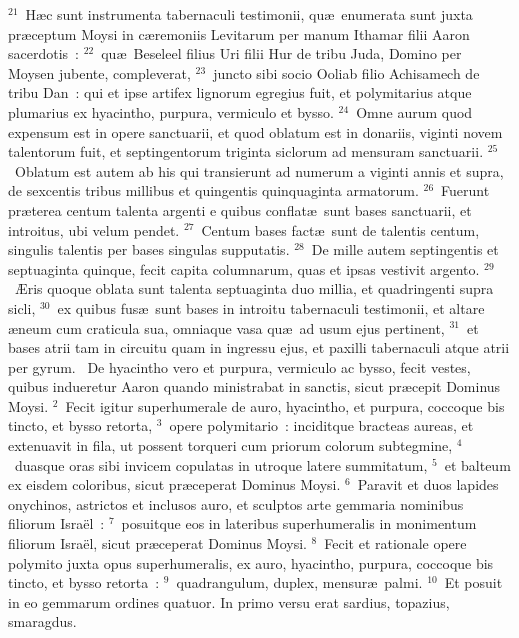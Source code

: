 ${}^{21}$~H\ae c sunt instrumenta tabernaculi testimonii, qu\ae\ enumerata sunt juxta pr\ae ceptum Moysi in c\ae remoniis Levitarum per manum Ithamar filii Aaron sacerdotis~:
${}^{22}$~qu\ae\ Beseleel filius Uri filii Hur de tribu Juda, Domino per Moysen jubente, compleverat,
${}^{23}$~juncto sibi socio Ooliab filio Achisamech de tribu Dan~: qui et ipse artifex lignorum egregius fuit, et polymitarius atque plumarius ex hyacintho, purpura, vermiculo et bysso.
${}^{24}$~Omne aurum quod expensum est in opere sanctuarii, et quod oblatum est in donariis, viginti novem talentorum fuit, et septingentorum triginta siclorum ad mensuram sanctuarii.
${}^{25}$~Oblatum est autem ab his qui transierunt ad numerum a viginti annis et supra, de sexcentis tribus millibus et quingentis quinquaginta armatorum.
${}^{26}$~Fuerunt pr\ae terea centum talenta argenti e quibus conflat\ae\ sunt bases sanctuarii, et introitus, ubi velum pendet.
${}^{27}$~Centum bases fact\ae\ sunt de talentis centum, singulis talentis per bases singulas supputatis.
${}^{28}$~De mille autem septingentis et septuaginta quinque, fecit capita columnarum, quas et ipsas vestivit argento.
${}^{29}$~\AE ris quoque oblata sunt talenta septuaginta duo millia, et quadringenti supra sicli,
${}^{30}$~ex quibus fus\ae\ sunt bases in introitu tabernaculi testimonii, et altare \ae neum cum craticula sua, omniaque vasa qu\ae\ ad usum ejus pertinent,
${}^{31}$~et bases atrii tam in circuitu quam in ingressu ejus, et paxilli tabernaculi atque atrii per gyrum.
~De hyacintho vero et purpura, vermiculo ac bysso, fecit vestes, quibus indueretur Aaron quando ministrabat in sanctis, sicut pr\ae cepit Dominus Moysi.
${}^{2}$~Fecit igitur superhumerale de auro, hyacintho, et purpura, coccoque bis tincto, et bysso retorta,
${}^{3}$~opere polymitario~: inciditque bracteas aureas, et extenuavit in fila, ut possent torqueri cum priorum colorum subtegmine,
${}^{4}$~duasque oras sibi invicem copulatas in utroque latere summitatum,
${}^{5}$~et balteum ex eisdem coloribus, sicut pr\ae ceperat Dominus Moysi.
${}^{6}$~Paravit et duos lapides onychinos, astrictos et inclusos auro, et sculptos arte gemmaria nominibus filiorum Isra\"el~:
${}^{7}$~posuitque eos in lateribus superhumeralis in monimentum filiorum Isra\"el, sicut pr\ae ceperat Dominus Moysi.
${}^{8}$~Fecit et rationale opere polymito juxta opus superhumeralis, ex auro, hyacintho, purpura, coccoque bis tincto, et bysso retorta~:
${}^{9}$~quadrangulum, duplex, mensur\ae\ palmi.
${}^{10}$~Et posuit in eo gemmarum ordines quatuor. In primo versu erat sardius, topazius, smaragdus.
